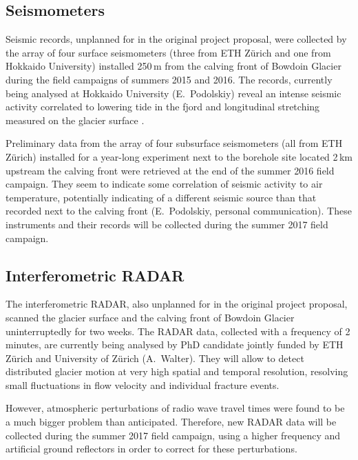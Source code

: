 \documentclass{article}
\begin{document}
\subsection{Seismometers}

Seismic records, unplanned for in the original project proposal, were collected
by the array of four surface seismometers (three from ETH Zürich and one from
Hokkaido University) installed 250\,m from the calving front of Bowdoin Glacier
during the field campaigns of summers 2015 and 2016. The records, currently
being analysed at Hokkaido University (E.~Podolskiy) reveal an intense seismic
activity correlated to lowering tide in the fjord and longitudinal stretching
measured on the glacier surface \citep{Podoslkiy.etal.2016}.

Preliminary data from the array of four subsurface seismometers (all from ETH
Zürich) installed for a year-long experiment next to the borehole site located
2\,km upstream the calving front were retrieved at the end of the summer 2016
field campaign. They seem to indicate some correlation of seismic activity to
air temperature, potentially indicating of a different seismic source than that
recorded next to the calving front (E.~Podolskiy, personal communication).
These instruments and their records will be collected during the summer 2017
field campaign.


\subsection{Interferometric RADAR}

The interferometric RADAR, also unplanned for in the original project proposal,
scanned the glacier surface and the calving front of Bowdoin Glacier
uninterruptedly for two weeks. The RADAR data, collected with a frequency of
2\,minutes, are currently being analysed by PhD candidate jointly funded by
ETH Zürich and University of Zürich (A.~Walter). They will allow to detect
distributed glacier motion at very high spatial and temporal resolution,
resolving small fluctuations in flow velocity and individual fracture events.

However, atmospheric perturbations of radio wave travel times were found to be
a much bigger problem than anticipated. Therefore, new RADAR data will be
collected during the summer 2017 field campaign, using a higher frequency and
artificial ground reflectors in order to correct for these perturbations.


\end{document}
